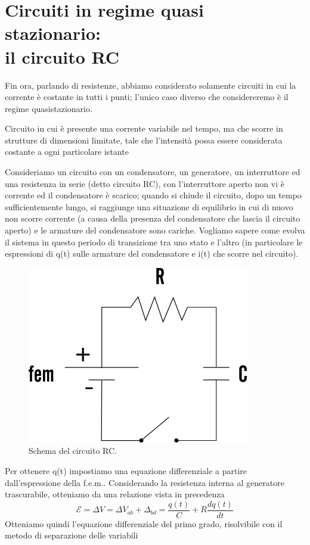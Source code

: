 \documentclass[
10pt, %
a4paper, %
oneside, %
headinclude,footinclude, %
BCOR5mm, %
]{scrartcl}
\begin{document}
\section{Circuiti in regime quasi stazionario:\\ il circuito RC}
Fin ora, parlando di resistenze, abbiamo considerato solamente circuiti in cui la corrente è costante in tutti i punti; l'unico caso diverso che considereremo è il regime quasistazionario.
\begin{definizione}
	Circuito in cui è presente una corrente variabile nel tempo, ma che scorre in strutture di dimensioni limitate, tale che l'intensità possa essere considerata costante a ogni particolare istante
\end{definizione}
Consideriamo un circuito con un condensatore, un generatore, un interruttore ed una resistenza in serie (detto circuito RC), con l'interruttore aperto non vi è corrente ed il condensatore è scarico; quando si chiude il circuito, dopo un tempo sufficientemente lungo, si raggiunge una situazione di equilibrio in cui di nuovo non scorre corrente (a causa della presenza del condensatore che lascia il circuito aperto) e le armature del condensatore sono cariche. Vogliamo sapere come evolva il sistema in questo periodo di transizione tra uno stato e l'altro (in particolare le espressioni di q(t) sulle armature del condensatore e i(t) che scorre nel circuito). 
\begin{figure}[h!]
	\centering
	\includegraphics[width=0.5\linewidth]{../images/circuito-rc}
	\caption{Schema del circuito RC.}
	\label{fig:circuito-rc}
\end{figure}
\FloatBarrier
Per ottenere q(t) impostiamo una equazione differenziale a partire dall'espressione della f.e.m.. Considerando la resistenza interna al generatore trascurabile, otteniamo da una relazione vista in precedenza 
\[\mathcal{E} = \Delta V = \Delta V_{ab} + \Delta_{bd} = \frac{q(t)}{C}+R\frac{dq(t)}{dt}\]
Otteniamo quindi l'equazione differenziale del primo grado, risolvibile con il metodo di separazione delle variabili
\end{document}

